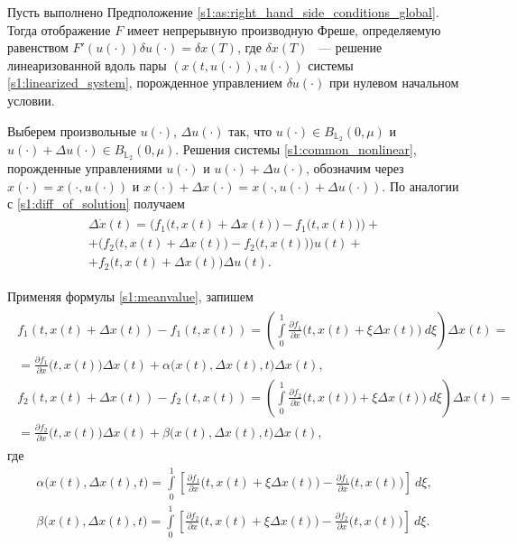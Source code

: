 \documentclass[../main.tex]{subfiles}
\begin{document}
\begin{lemma}\label{s1:lem:frechet_derivative_common}
    Пусть выполнено  Предположение \ref{s1:as:right_hand_side_conditions_global}.
    Тогда отображение $F$ имеет непрерывную производную Фреше, определяемую равенством $ F'(u(\cdot))\delta u(\cdot) =\delta x(T)$, где $\delta x(T)$ ~--- решение линеаризованной вдоль пары $\left( x(t,u(\cdot)),u(\cdot)\right)  $ системы \eqref{s1:linearized_system}, порожденное управлением $\delta u(\cdot)$ при нулевом начальном условии.
\end{lemma}
\doc 
Выберем произвольные $u(\cdot)$, $\Delta u(\cdot)$ так, что $ u(\cdot) \in B_{\mathbb{L}_2}(0,\mu)$ и $ u(\cdot) +  \Delta u(\cdot) \in B_{\mathbb{L}_2}(0,\mu)$.
Решения системы \eqref{s1:common_nonlinear}, порожденные управлениями  $u(\cdot)$ и $u(\cdot) + \Delta u(\cdot)$, обозначим через  $x(\cdot) = x(\cdot,u(\cdot))$ и $ x(\cdot) + \Delta x(\cdot) = x(\cdot, u(\cdot) + \Delta u(\cdot))$.
По аналогии с \eqref{s1:diff_of_solution} получаем
\begin{gather}\label{s1:delta_x}
\begin{gathered}
    \Delta \dot{x}(t) =
    \Big( f_1\big(t, x(t)+\Delta x(t)\big) - f_1\big(t, x(t)\big) \Big)  +  \\ + 
     \Big( f_2\big(t, x(t)+\Delta x(t)\big) - f_2\big(t,x(t)\big) \Big) u(t)  + \\ +
    f_2\big(t, x(t)+\Delta x(t)\big)  \Delta u(t) . 
\end{gathered}
\end{gather}
    
Применяя формулы \eqref{s1:meanvalue}, запишем 
\begin{gather*}
\begin{gathered}
    f_1(t, x(t)+\Delta x(t)) - f_1(t, x(t)) = \left(  \int\limits_0^1 \frac{\partial f_1}{\partial x} \Big(t, x(t) + \xi \Delta x(t)\Big) \ d\xi \right) \Delta x(t) =  \\  = \frac{\partial f_1}{\partial x} \Big(t, x(t)\Big)  \Delta x(t) + \alpha\Big(x(t),\Delta x(t), t\Big) \Delta x(t), \\ 
    f_2(t, x(t)+\Delta x(t)) - f_2(t, x(t)) = \left(  \int\limits_0^1 \frac{\partial f_2}{\partial x} \Big(t, x(t)) + \xi \Delta x(t)\Big) \ d\xi \right) \Delta x(t)=  \\  = \frac{\partial f_2}{\partial x} \Big(t, x(t)\Big)  \Delta x(t) + \beta\Big(x(t),\Delta x(t), t\Big) \Delta x(t), 
\end{gathered}
\end{gather*}
где 
\begin{gather*}
    \alpha\Big(x(t),\Delta x(t), t\Big) = 
     \int\limits_0^1 \left[ \frac{\partial f_1}{\partial x} \Big(t, x(t) + \xi \Delta x(t)\Big)  - \frac{\partial f_1}{\partial x} \Big(t, x(t)\Big)  \right] \ d\xi ,\\
    \beta\Big(x(t),\Delta x(t), t\Big) = 
     \int\limits_0^1 \left[ \frac{\partial f_2}{\partial x} \Big(t, x(t) + \xi \Delta x(t)\Big)  - \frac{\partial f_2}{\partial x} \Big(t, x(t)\Big)  \right] \ d\xi.
\end{gather*}
    
\end{document}
